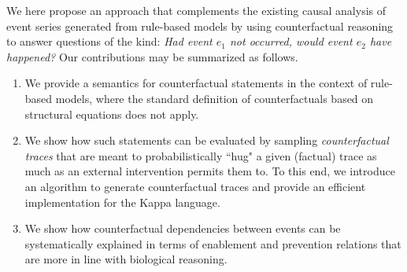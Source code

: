 We here propose an approach that complements the existing causal analysis of
event series generated from rule-based models by using counterfactual reasoning
to answer questions of the kind: \textit{Had event $e_1$ not occurred, would
event $e_2$ have happened?} Our contributions
may be summarized as follows.
\begin{enumerate}[leftmargin=0.6cm]
\item We provide a semantics for counterfactual statements in the context of
rule-based models, where the standard definition of counterfactuals based on
structural equations \cite{pearl2009causality,halpern2016actual} does not apply.
\item We show how such statements can be evaluated by sampling
\emph{counterfactual traces} that are meant to probabilistically ``hug" a given
(factual) trace as much as an external intervention permits them to. To this
end, we introduce an algorithm to generate counterfactual traces and provide an
efficient implementation for the Kappa language.
\item We show how counterfactual dependencies between events can be
systematically explained in terms of enablement and prevention relations that
are more in line with biological reasoning.
\end{enumerate}
